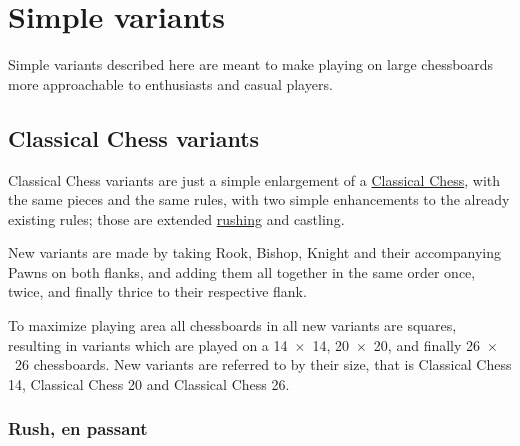 

\chapter*{Simple variants}
\label{ch:Simple variants}

Simple variants described here are meant to make playing on large chessboards
more approachable to enthusiasts and casual players.


\section*{Classical Chess variants}
\label{sec:Simple variants/Classical Chess variants}

Classical Chess variants are just a simple enlargement of a
\href{https://en.wikipedia.org/wiki/Chess}{Classical Chess},
with the same pieces and the same rules, with two simple enhancements to the
already existing rules; those are extended
\hyperref[sec:Classical Chess/Variants/Terms/Rush]{rushing} and castling.

New variants are made by taking Rook, Bishop, Knight and their accompanying
Pawns on both flanks, and adding them all together in the same order once,
twice, and finally thrice to their respective flank.

To maximize playing area all chessboards in all new variants are squares,
resulting in variants which are played on a 14~$\times$~14, 20~$\times$~20,
and finally 26~$\times$~26 chessboards.\newline
\indent
New variants are referred to by their size, that is Classical Chess 14,
Classical Chess 20 and Classical Chess 26.

\clearpage %

\subsection*{Rush, en passant}
\label{sec:Simple variants/Classical Chess variants/Rush, en passant}

